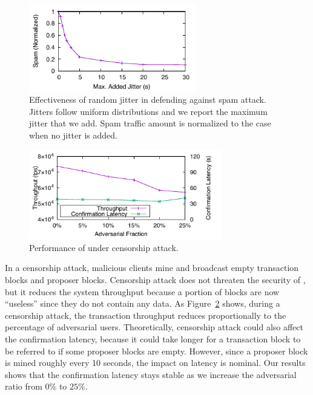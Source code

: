 \begin{figure}
    \centering
    \includegraphics[width=0.65\textwidth]{figures/attack-fig-spamming.pdf}
    \caption{\small Effectiveness of random jitter in defending against spam attack. Jitters follow uniform distributions and we report the maximum jitter that we add. Spam traffic amount is normalized to the case when no jitter is added.}
    \label{fig:attack-spamming}
\end{figure}









\begin{figure}
    \centering
    \includegraphics[width=0.75\textwidth]{figures/attack-fig-censor.pdf}
    \caption{\small Performance of \prism under  censorship attack.}
    \label{fig:attack-censor}
\end{figure}

In a censorship attack, malicious clients mine and broadcast empty transaction blocks and proposer blocks. Censorship attack does not threaten the security of \prism, but it reduces the system throughput because a portion of blocks are now ``useless'' since they do not contain any data. As Figure~\ref{fig:attack-censor} shows, during a censorship attack, the transaction throughput reduces proportionally to the percentage of adversarial users. Theoretically, censorship attack could also affect the confirmation latency, because it could take longer for a transaction block to be referred to if some proposer blocks are empty. However, since a proposer block is mined roughly every 10 seconds, the impact on latency is nominal. Our results shows that the confirmation latency stays stable as we increase the adversarial ratio from $0\%$ to $25\%$.


